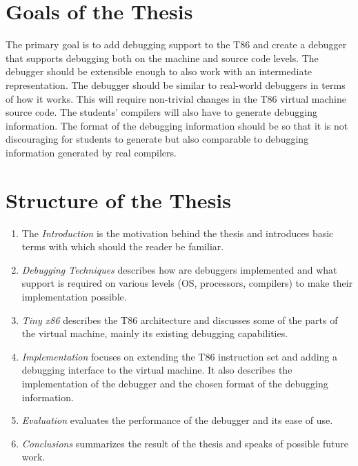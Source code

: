 \section{Goals of the Thesis}
The primary goal is to add debugging support to the T86 and create a debugger
that supports debugging both on the machine and source code levels. The
debugger should be extensible enough to also work with an intermediate
representation. The debugger should be similar to real-world debuggers in terms
of how it works. This will require non-trivial changes in the T86 virtual
machine source code. The students' compilers will also have to generate
debugging information. The format of the debugging information should be so
that it is not discouraging for students to generate but also comparable to
debugging information generated by real compilers.

\section{Structure of the Thesis}
\begin{enumerate}
    \item The \textit{Introduction} is the motivation behind the thesis and
        introduces basic terms with which should the reader be familiar.
    \item \textit{Debugging Techniques} describes how are debuggers implemented
        and what support is required on various levels (OS, processors,
        compilers) to make their implementation possible.
    \item \textit{Tiny x86} describes the T86 architecture and discusses some
        of the parts of the virtual machine, mainly its existing debugging
        capabilities.
    \item \textit{Implementation} focuses on extending the T86 instruction set
        and adding a debugging interface to the virtual machine. It also
        describes the implementation of the debugger and the chosen format of
        the debugging information.
    \item \textit{Evaluation} evaluates the performance of the debugger and its
        ease of use.
    \item \textit{Conclusions} summarizes the result of the thesis and speaks
        of possible future work.
\end{enumerate}
